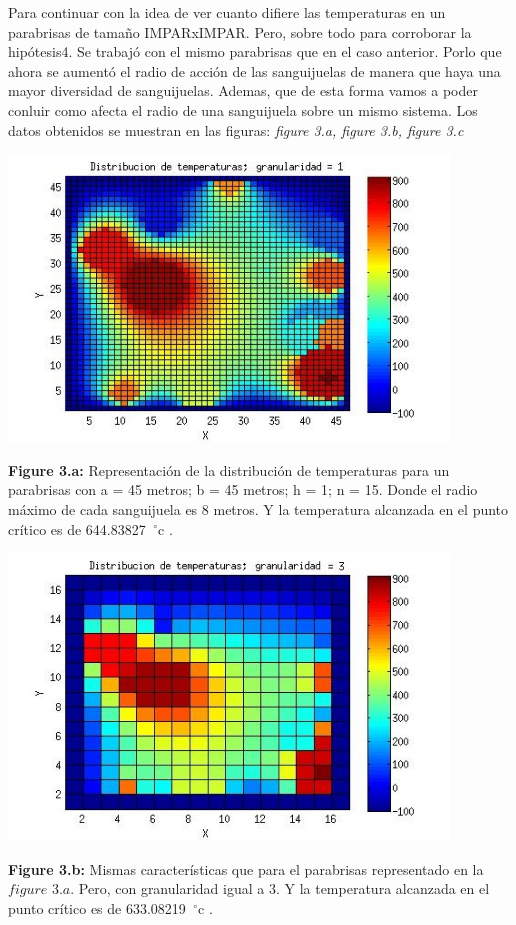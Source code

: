 \documentclass[a4paper]{article}
\begin{document}
Para continuar con la idea de ver cuanto difiere las temperaturas en un parabrisas de tamaño IMPARxIMPAR. Pero, sobre todo para corroborar la hipótesis4. Se trabajó con el mismo parabrisas que en el caso anterior. Porlo que ahora se aumentó el radio de acción de las sanguijuelas de manera que haya una mayor diversidad de sanguijuelas. Ademas, que de esta forma vamos a poder conluir como afecta el radio de una sanguijuela sobre un mismo sistema. Los datos obtenidos se muestran en las figuras: \textit{figure 3.a, figure 3.b, figure 3.c}  \newline


\includegraphics[width=\textwidth,height=3.0in,keepaspectratio
]{r7h1.jpg} \newline
\begin {flushleft}
\textbf{Figure 3.a:} Representación de la distribución de temperaturas para un parabrisas con a = 45 metros; b = 45 metros; h = 1; n = 15. Donde el radio máximo de cada sanguijuela es 8 metros. Y la temperatura alcanzada en el punto crítico es de 644.83827\hspace{-1.5mm}$\phantom{a}^{\circ}$c .
\end{flushleft}

\includegraphics[width=\textwidth,height=3.0in,keepaspectratio
]{r7h3.jpg} \newline
\begin {flushleft}
\textbf{Figure 3.b:} Mismas características que para el parabrisas representado en la $figure$ $3.a$. Pero, con granularidad igual a 3. Y la temperatura alcanzada en el punto crítico es de 633.08219\hspace{-1.5mm}$\phantom{a}^{\circ}$c .
\end{flushleft}
\end{document}
